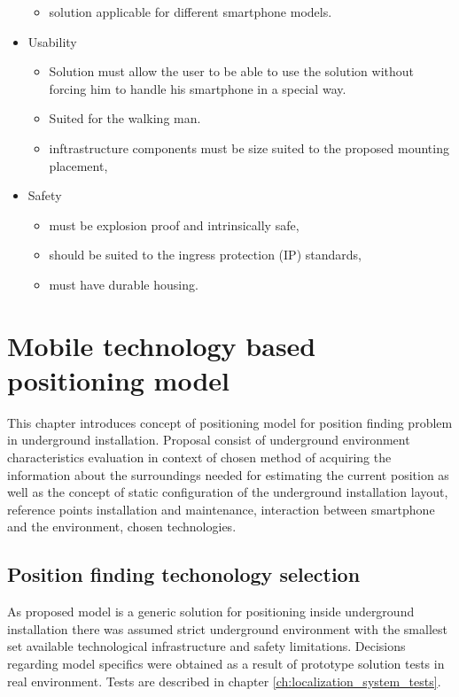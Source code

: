 \documentclass[../main.tex]{subfiles}
\begin{document}
\begin{itemize}
\begin{itemize}
		\item solution applicable for different smartphone models.
	\end{itemize}
	\item Usability
	\begin{itemize}
		\item Solution must allow the user to be able to use the solution without forcing him to handle his smartphone in a special way.
		\item Suited for the walking man.
		\item inftrastructure components must be size suited to the proposed mounting placement,
	\end{itemize}
	\item Safety
	\begin{itemize}
		\item must be explosion proof and intrinsically safe,
		\item should be suited to the ingress protection (IP) standards,
		\item must have durable housing.
	\end{itemize}
\end{itemize}



\chapter{Mobile technology based positioning model}
This chapter introduces concept of positioning model for position finding problem in underground installation. Proposal consist of underground environment characteristics evaluation in context of chosen method of acquiring the information about the surroundings needed for estimating the current position as well as the concept of static configuration of the underground installation layout, reference points installation and maintenance, interaction between smartphone and the environment, chosen technologies.

\section{Position finding techonology selection} %
\label{sec:position_finding_requirements}

As proposed model is a generic solution for positioning inside underground installation there was assumed strict underground environment with the smallest set available technological infrastructure and safety limitations. Decisions regarding model specifics were obtained as a result of prototype solution tests in real environment. Tests are described in chapter \ref{ch:localization_system_tests}.
\end{document}
